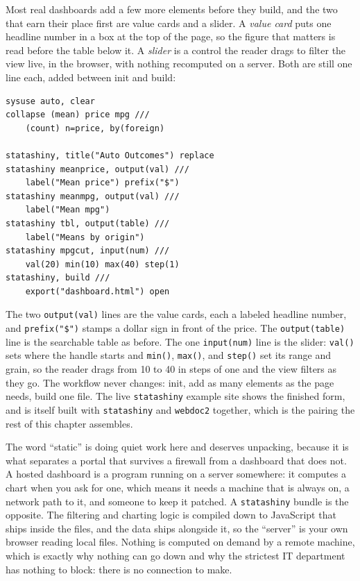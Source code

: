 \documentclass[
    a4paper,
    fontsize=10pt,
    twoside=true,
    numbers=noenddot,
]{kaobook}
\begin{document}
Most real dashboards add a few more elements before they build, and the two that earn their place first are value cards and a slider. A \emph{value card} puts one headline number in a box at the top of the page, so the figure that matters is read before the table below it. A \emph{slider} is a control the reader drags to filter the view live, in the browser, with nothing recomputed on a server. Both are still one line each, added between init and build:
{\footnotesize
\begin{verbatim}
sysuse auto, clear
collapse (mean) price mpg ///
    (count) n=price, by(foreign)

statashiny, title("Auto Outcomes") replace
statashiny meanprice, output(val) ///
    label("Mean price") prefix("$")
statashiny meanmpg, output(val) ///
    label("Mean mpg")
statashiny tbl, output(table) ///
    label("Means by origin")
statashiny mpgcut, input(num) ///
    val(20) min(10) max(40) step(1)
statashiny, build ///
    export("dashboard.html") open
\end{verbatim}
}
The two \texttt{output(val)} lines are the value cards, each a labeled headline number, and \texttt{prefix("\$")} stamps a dollar sign in front of the price. The \texttt{output(table)} line is the searchable table as before. The one \texttt{input(num)} line is the slider: \texttt{val()} sets where the handle starts and \texttt{min()}, \texttt{max()}, and \texttt{step()} set its range and grain, so the reader drags from 10 to 40 in steps of one and the view filters as they go. The workflow never changes: init, add as many elements as the page needs, build one file. The live \texttt{statashiny} example site shows the finished form, and is itself built with \texttt{statashiny} and \texttt{webdoc2} together, which is the pairing the rest of this chapter assembles.


The word \enquote{static} is doing quiet work here and deserves unpacking, because it is what separates a portal that survives a firewall from a dashboard that does not. A hosted dashboard is a program running on a server somewhere: it computes a chart when you ask for one, which means it needs a machine that is always on, a network path to it, and someone to keep it patched. A \texttt{statashiny} bundle is the opposite. The filtering and charting logic is compiled down to JavaScript that ships inside the files, and the data ships alongside it, so the \enquote{server} is your own browser reading local files. Nothing is computed on demand by a remote machine, which is exactly why nothing can go down and why the strictest IT department has nothing to block: there is no connection to make.
\end{document}
